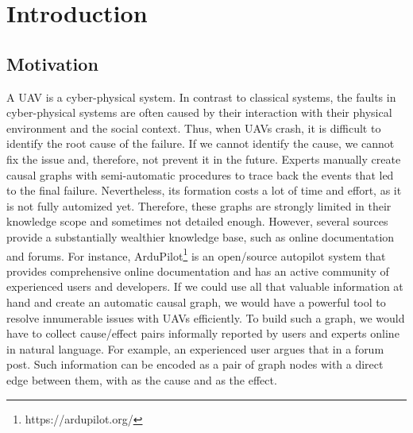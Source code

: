 \chapter{Introduction}\label{ch:introduction}


\section{Motivation}\label{sec:motivation}
A \ac{UAV} is a cyber-physical system.
In contrast to classical systems, the faults in cyber-physical systems are often caused by their interaction with their physical environment and the social context.
Thus, when \ac{UAV}s crash, it is difficult to identify the root cause of the failure.
If we cannot identify the cause, we cannot fix the issue and, therefore, not prevent it in the future.
Experts manually create causal graphs with semi-automatic procedures \cite{ibrahim2019practical} to trace back the events that led to the final failure.
Nevertheless, its formation costs a lot of time and effort, as it is not fully automized yet.
Therefore, these graphs are strongly limited in their knowledge scope and sometimes not detailed enough.
However, several sources provide a substantially wealthier knowledge base, such as online documentation and forums.
For instance, ArduPilot\footnote{https://ardupilot.org/} is an open/source autopilot system that provides comprehensive online documentation and has an active community of experienced users and developers.
If we could use all that valuable information at hand and create an automatic causal graph, we would have a powerful tool to resolve innumerable issues with \ac{UAV}s efficiently.
To build such a graph, we would have to collect cause/effect pairs informally reported by users and experts online in natural language.
For example, an experienced user argues that  in a forum post.
Such information can be encoded as a pair of graph nodes with a direct edge between them, with  as the cause and  as the effect.


